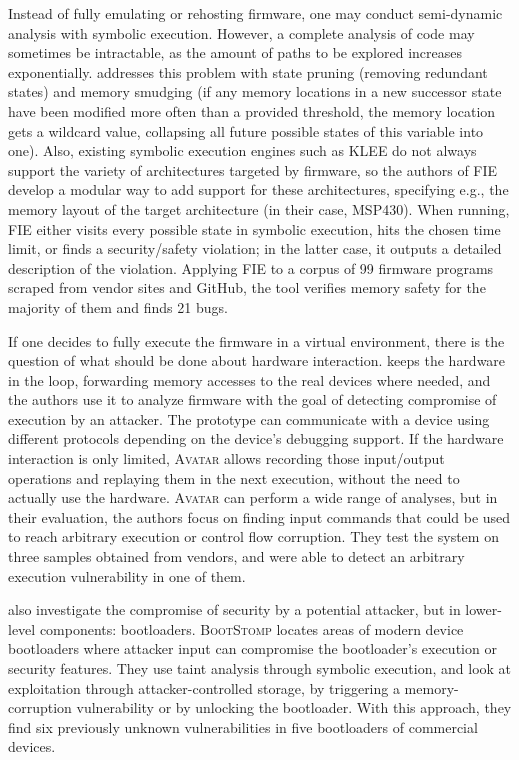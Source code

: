 Instead of fully emulating or rehosting firmware, one may conduct semi-dynamic analysis with symbolic execution.
However, a complete analysis of code may sometimes be intractable, as the amount of paths to be explored increases exponentially.
 addresses this problem with state pruning (removing redundant states) and memory smudging (if any memory locations in a new successor state have been modified more often than a provided threshold, the memory location gets a wildcard value, collapsing all future possible states of this variable into one).
Also, existing symbolic execution engines such as \textsc{KLEE} do not always support the variety of architectures targeted by firmware, so the authors of \textsc{FIE} develop a modular way to add support for these architectures, specifying e.g., the memory layout of the target architecture (in their case, MSP430).
When running, \textsc{FIE} either visits every possible state in symbolic execution, hits the chosen time limit, or finds a security/safety violation; in the latter case, it outputs a detailed description of the violation.
Applying \textsc{FIE} to a corpus of \num{99} firmware programs scraped from vendor sites and GitHub, the tool verifies memory safety for the majority of them and finds \num{21} bugs.

If one decides to fully execute the firmware in a virtual environment, there is the question of what should be done about hardware interaction.
 keeps the hardware in the loop, forwarding memory accesses to the real devices where needed, and the authors use it to analyze firmware with the goal of detecting compromise of execution by an attacker.
The prototype can communicate with a device using different protocols depending on the device's debugging support.
If the hardware interaction is only limited, \textsc{Avatar} allows recording those input/output operations and replaying them in the next execution, without the need to actually use the hardware.
\textsc{Avatar} can perform a wide range of analyses, but in their evaluation, the authors focus on finding input commands that could be used to reach arbitrary execution or control flow corruption.
They test the system on three samples obtained from vendors, and were able to detect an arbitrary execution vulnerability in one of them.

 also investigate the compromise of security by a potential attacker, but in lower-level components: bootloaders.
\textsc{BootStomp} locates areas of modern device bootloaders where attacker input can compromise the bootloader's execution or security features.
They use taint analysis through symbolic execution, and look at exploitation through attacker-controlled storage, by triggering a memory-corruption vulnerability or by unlocking the bootloader.
With this approach, they find six previously unknown vulnerabilities in five bootloaders of commercial devices.

